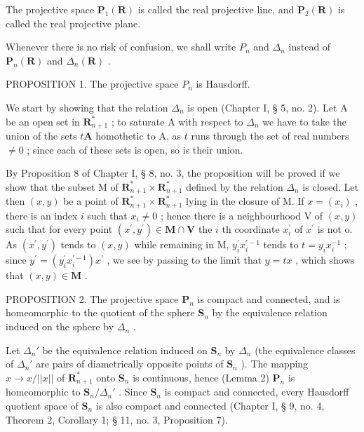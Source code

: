 The projective space \(\mathbf{P}_{1}(\mathbf{R})\) is called the real projective line, and \(\mathbf{P}_{2}(\mathbf{R})\) is called the real projective plane.

Whenever there is no risk of confusion, we shall write \(P_{n}\) and \(\Delta_{n}\) instead of \(\mathbf{P}_{n}(\mathbf{R})\) and \(\Delta_{n}(\mathbf{R})\) .

PROPOSITION 1. The projective space \(P_{n}\) is Hausdorff.

We start by showing that the relation \(\Delta_{n}\) is open (Chapter I, § 5, no. 2). Let A be an open set in \(\mathbf{R}_{n+1}^{*}\) ; to saturate A with respect to \(\Delta_{n}\) we have to take the union of the sets \(t\mathbf{A}\) homothetic to A, as \(t\) runs through the set of real numbers \(\neq 0\) ; since each of these sets is open, so is their union.

By Proposition 8 of Chapter I, § 8, no. 3, the proposition will be proved if we show that the subset M of \(\mathbf{R}_{n+1}^{*}\times\mathbf{R}_{n+1}^{*}\) defined by the relation \(\Delta_{n}\) is closed. Let then \((x,y)\) be a point of \(\mathbf{R}_{n+1}^{*}\times\mathbf{R}_{n+1}^{*}\) lying in the closure of M. If \(x=(x_{i})\) , there is an index \(i\) such that \(x_{i}\neq0\) ; hence there is a neighbourhood V of \((x,y)\) such that for every point \((x^{\prime},y^{\prime})\in\mathbf{M}\cap\mathbf{V}\) the \(i\) th coordinate \(x_{i}^{\prime}\) of \(x^{\prime}\) is not o. As \((x^{\prime},y^{\prime})\) tends to \((x,y)\) while remaining in M, \(y_{i}^{\prime}x_{i}^{\prime-1}\) tends to \(t=y_{i}x_{i}^{-1}\) ; since \(y^{\prime}=(y_{i}^{\prime}x_{i}^{\prime-1})x^{\prime}\) , we see by passing to the limit that \(y=tx\) , which shows that \((x,y)\in\mathbf{M}\) .

PROPOSITION 2. The projective space \(\mathbf{P}_{n}\) is compact and connected, and is homeomorphic to the quotient of the sphere \(\mathbf{S}_{n}\) by the equivalence relation induced on the sphere by \(\Delta_{n}\) .

Let \(\Delta_n'\) be the equivalence relation induced on \(\mathbf{S}_n\) by \(\Delta_n\) (the equivalence classes of \(\Delta_n'\) are pairs of diametrically opposite points of \(\mathbf{S}_n\) ). The mapping \(x \to x/||x||\) of \(\mathbf{R}_{n+1}^*\) onto \(\mathbf{S}_n\) is continuous, hence (Lemma 2) \(\mathbf{P}_n\) is homeomorphic to \(\mathbf{S}_n/\Delta_n'\) . Since \(\mathbf{S}_n\) is compact and connected, every Hausdorff quotient space of \(\mathbf{S}_n\) is also compact and connected (Chapter I, § 9, no. 4, Theorem 2, Corollary 1; § 11, no. 3, Proposition 7).

